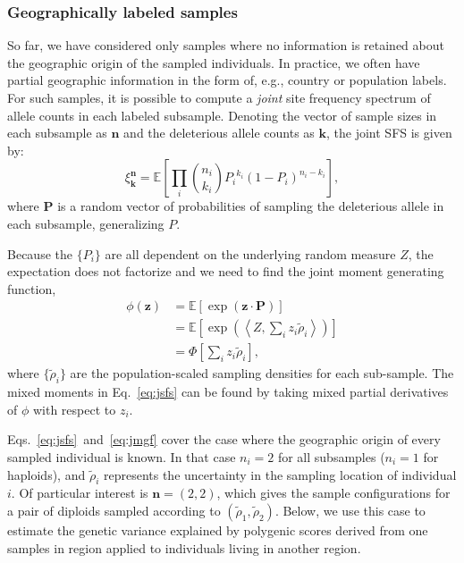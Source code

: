 \documentclass{article}
\begin{document}
\subsubsection*{Geographically labeled samples}

So far, we have considered only samples where no information is retained about the geographic origin of the sampled individuals.
In practice, we often have partial geographic information in the form of, e.g., country or population labels.
For such samples, it is possible to compute a \emph{joint} site frequency spectrum of allele counts in each labeled subsample.
Denoting the vector of sample sizes in each subsample as $\mathbf{n}$ and the deleterious allele counts as $\mathbf{k}$, the joint SFS is given by:
\begin{equation}
    \xi^{\mathbf{n}}_{\mathbf{k}} = \mathbb{E} \left[ \prod_i {n_i \choose k_i} {P_i}^{k_i} {(1-P_i)}^{n_i - k_i} \right],
    \label{eq:jsfs}
\end{equation}
where $\mathbf{P}$ is a random vector of probabilities of sampling the deleterious allele in each subsample, generalizing $P$.

Because the $\{P_i\}$ are all dependent on the underlying random measure $Z$, the expectation does not factorize and we need to find the joint moment generating function,
\begin{align}
    \phi(\mathbf{z}) & = \mathbb{E} \left[ \exp \left(\mathbf{z} \cdot \mathbf{P} \right) \right] \nonumber \\
                     & = \mathbb{E} \left[ \exp \left( \left< Z, \sum_i z_i \tilde{\rho}_i \right> \right) \right] \nonumber \\
                     & = \Phi \left[\sum_i z_i \tilde{\rho}_i \right],
                     \label{eq:jmgf}
\end{align}
where $\{\tilde{\rho}_i\}$ are the population-scaled sampling densities for each sub-sample.
The mixed moments in Eq.~\ref{eq:jsfs} can be found by taking mixed partial derivatives of $\phi$ with respect to $z_i$.

Eqs.~\ref{eq:jsfs}~and~\ref{eq:jmgf} cover the case where the geographic origin of every sampled individual is known.
In that case $n_i = 2$ for all subsamples ($n_i = 1$ for haploids), and $\tilde{\rho}_i$ represents the uncertainty in the sampling location of individual $i$.
Of particular interest is $\mathbf{n} = (2,2)$, which gives the sample configurations for a pair of diploids sampled according to $(\tilde{\rho}_1, \tilde{\rho}_2)$.
Below, we use this case to estimate the genetic variance explained by polygenic scores derived from one samples in region applied to individuals living in another region.
\end{document}
